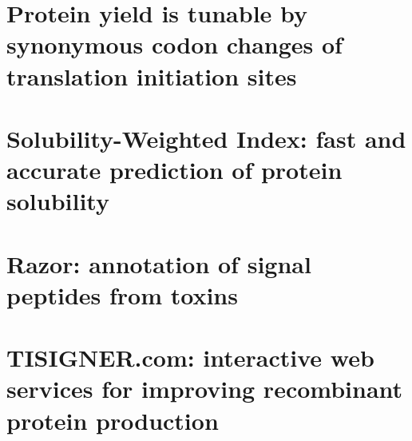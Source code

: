 \documentclass[]{lincolncsthesis}
\begin{document}
\printReferences



\appendix

\chapter{Protein yield is tunable by synonymous codon changes of translation initiation sites}


\chapter{Solubility-Weighted Index: fast and accurate prediction of protein solubility}


\chapter{Razor: annotation of signal peptides from toxins}



\chapter{TISIGNER.com: interactive web services for improving recombinant protein production}

\end{document}
